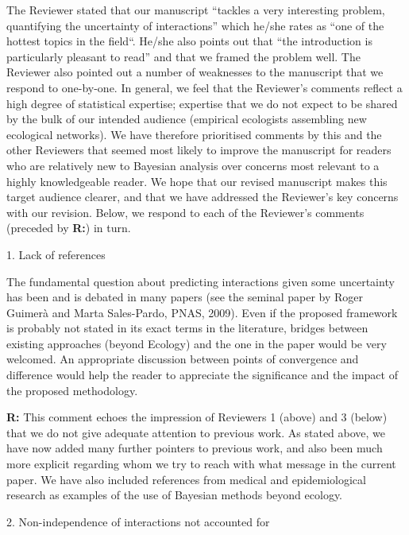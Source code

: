 \documentclass[12pt]{letter}
\newenvironment{refquote}{\bigskip \begin{it}}{\end{it}\smallskip}
\begin{document}
	The Reviewer stated that our manuscript ``tackles a very interesting problem, quantifying the uncertainty of interactions'' which he/she rates as ``one of the hottest topics in the field``. He/she also points out that ``the introduction is particularly pleasant to read'' and that we framed the problem well. The Reviewer also pointed out a number of weaknesses to the manuscript that we respond to one-by-one. In general, we feel that the Reviewer's comments reflect a high degree of statistical expertise; expertise that we do not expect to be shared by the bulk of our intended audience (empirical ecologists assembling new ecological networks). We have therefore prioritised comments by this and the other Reviewers that seemed most likely to improve the manuscript for readers who are relatively new to Bayesian analysis over concerns most relevant to a highly knowledgeable reader. We hope that our revised manuscript makes this target audience clearer, and that we have addressed the Reviewer's key concerns with our revision. Below, we respond to each of the Reviewer's comments (preceded by \textbf{R:}) in turn.


	1. Lack of references 


		\begin{refquote}
			
			The fundamental question about predicting interactions given some uncertainty has been and is debated in many papers (see the seminal paper by Roger Guimer\`{a} and Marta Sales-Pardo, PNAS, 2009). Even if the proposed framework is probably not stated in its exact terms in the literature, bridges between existing approaches (beyond Ecology) and the one in the paper would be very welcomed. An appropriate discussion between points of convergence and difference would help the reader to appreciate the significance and the impact of the proposed methodology.
		
		\end{refquote}


		\textbf{R:} This comment echoes the impression of Reviewers 1 (above) and 3 (below) that we do not give adequate attention to previous work. As stated above, we have now added many further pointers to previous work, and also been much more explicit regarding whom we try to reach with what message in the current paper. We have also included references from medical and epidemiological research as examples of the use of Bayesian methods beyond ecology. 


	2. Non-independence of interactions not accounted for 
\end{document}
